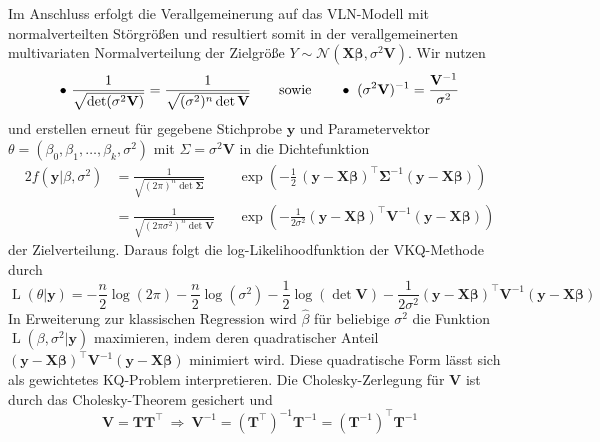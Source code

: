 Im Anschluss erfolgt die Verallgemeinerung auf das VLN-Modell mit normalverteilten Störgrößen 
und resultiert somit in der verallgemeinerten multivariaten Normalverteilung 
der Zielgröße $Y \sim \mathcal{N}(\mathbf{X\beta} ,\sigma^2 \mathbf{V})$. Wir nutzen
\begin{equation*}
    \bullet ~ \frac{1}{\sqrt{\det(\sigma^2 \mathbf{V})} }= \frac{1}{\sqrt{(\sigma^{2})^n \det \mathbf{V} }} \\
    \qquad \text{sowie} \qquad \bullet ~ (\sigma^2 \mathbf{V})^{-1}  = \frac{\mathbf{V}^{-1}}{\sigma^2}
\end{equation*}
und erstellen erneut für gegebene Stichprobe $\mathbf{y}$ und
Parametervektor $\theta=(\beta_{0},\beta_{1},\ldots,\beta_{k},\sigma^{2})$ mit 
$\Sigma=\sigma^2 \mathbf{V}$ in die Dichtefunktion
\begin{alignat*}{2}
    f(\mathbf{y}|\beta,\sigma^2) & = \frac{1}{ \sqrt{(2 \pi)^{n} \det \mathbf{\Sigma} } } 
    &&\exp \left( -\frac{1}{2 } \, \left(\mathbf{y-X\beta} \right)^{\top} \mathbf{\Sigma}^{-1} \left( \mathbf{y-X\beta} \right) \right)\\
    & =\frac{1}{ \sqrt{(2 \pi  \sigma^2)^n \det \mathbf{V} } } 
    &&\exp \left(-\frac{1}{2 \sigma^2} \left( \mathbf{y-X\beta} \right)^{\top} \mathbf{V}^{-1} \left( \mathbf{y-X\beta} \right) \right)
\end{alignat*}
der Zielverteilung. Daraus folgt die log-Likelihoodfunktion der VKQ-Methode durch
\begin{equation*}
    \operatorname{L}(\theta|\mathbf{y})= -\frac{n}{2} \log(2\pi) -\frac{n}{2} \log(\sigma^{2}) -\frac{1}{2} \log(\det \mathbf{V} )
    -\frac{1}{2\sigma^{2}} \left( \mathbf{y-X\beta} \right)^{\top} \mathbf{V}^{-1} \left( \mathbf{y-X\beta} \right)
\end{equation*}
In Erweiterung zur klassischen Regression wird  $\hat{\beta}$ für beliebige $\sigma^2$ die Funktion $\operatorname{L}(\beta,\sigma^2|\mathbf{y})$ 
maximieren, indem deren quadratischer Anteil $\left( \mathbf{y-X\beta} \right)^{\top} \mathbf{V}^{-1} \left( \mathbf{y-X\beta} \right)$ minimiert wird.
Diese quadratische Form lässt sich als gewichtetes KQ-Problem interpretieren. Die Cholesky-Zerlegung für $\mathbf{V}$ 
ist durch das Cholesky-Theorem gesichert und
\begin{equation*}
    \mathbf{V}=\mathbf{T} \mathbf{T}^{\top} ~ \Rightarrow ~ \mathbf{V}^{-1} 
    = \left( \mathbf{T}^{\top} \right)^{-1} \mathbf{T}^{-1}
    = \left( \mathbf{T}^{-1} \right)^{\top} \mathbf{T}^{-1}
\end{equation*}
